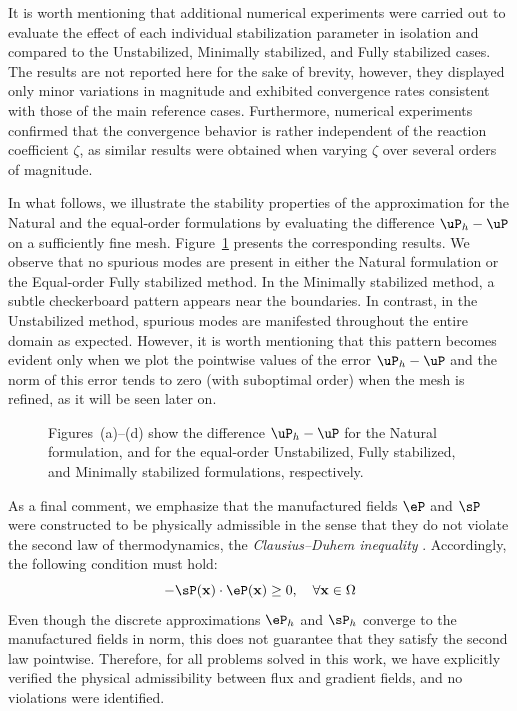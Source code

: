 It is worth mentioning that additional numerical experiments were carried out to evaluate the effect of each individual stabilization parameter in isolation and compared to the Unstabilized, Minimally stabilized, and Fully stabilized cases. The results are not reported here for the sake of brevity, however, they displayed only minor variations in magnitude and exhibited convergence rates consistent with those of the main reference cases. Furthermore, numerical experiments confirmed that the convergence behavior is rather independent of the reaction coefficient $ \zeta $, as similar results were obtained when varying $\zeta$ over several orders of magnitude.

In what follows, we illustrate the stability properties of the approximation for the Natural and 
the equal-order formulations by evaluating the difference $\uP_{h} - \uP$ on a sufficiently fine mesh. Figure~\ref{fig:checkerboard_pattern} presents the corresponding results. We observe that no spurious modes 
are present in either the Natural formulation or the Equal-order Fully stabilized method. 
In the Minimally stabilized method, a subtle checkerboard pattern appears near the boundaries. In contrast, in the Unstabilized method, spurious modes are manifested throughout the entire 
domain as expected. However, it is worth mentioning that this pattern becomes evident 
only when we plot the pointwise values of the error $\uP_{h} - \uP$ and the norm of 
this error tends to zero (with suboptimal order) when the mesh is refined,
 as it will be seen later on.
\begin{figure}[h!]
	\centering
	\caption{Figures~(a)--(d) show the difference $\uP_{h} - \uP$ for the Natural formulation, and for the equal-order Unstabilized, Fully stabilized, and Minimally stabilized formulations, respectively. }
	\def\svgwidth{1.0\columnwidth}
	
	\label{fig:checkerboard_pattern}
\end{figure}

As a final comment, we emphasize that the manufactured fields $ \eP $ and $ \sP $ were constructed to be physically admissible in the sense that they do not violate the second law of thermodynamics, the \textit{Clausius–Duhem inequality} \cite{Reddy2013,Gurtin2013}. Accordingly, the following condition must hold:
$$
-\sP(\mathbf{x}) \cdot \eP(\mathbf{x}) \geq 0, \quad \forall \mathbf{x} \in \Omega
$$ 
Even though the discrete approximations $ \eP_{h} $ and $ \sP_{h} $ converge to the manufactured fields in norm, this does not guarantee that they satisfy the second law pointwise. Therefore, for all problems solved in this work, we have explicitly verified the physical admissibility between flux and gradient fields, and no violations were identified. 

